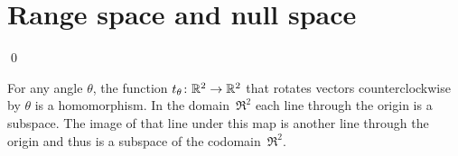 \documentclass[10pt,t]{beamer}
\begin{document}
\section{Range space and null space}
\begin{frame}
\lm[le:RangeIsSubSp]

\pause
\pf
{}
\qed

\pause
\ex
For any angle $\theta$, 
the function $\mbox{$t_{\theta}\colon \mathbb{R}^2\to \mathbb{R}^2$}$ that rotates 
vectors counterclockwise by $\theta$ is a homomorphism.
In the domain~$\Re^2$ each line through the origin is a subspace.
The image of that line under this map is another line through the origin 
and thus is a subspace of the codomain~$\Re^2$. 
\end{frame}
\end{document}
